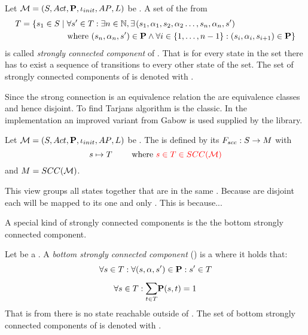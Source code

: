\documentclass[preview]{standalone}
\begin{document}
\begin{definition}
	Let ${{{\mathcal{M}}}} = {{({S}, {Act}, {\textbf{P}}, {\iota_{init}}, {AP}, {L})}}$ be \achgphN. A set of the from
	\begin{align*}
		{T} = \{{s}_1 \in {S} \mid & \; \forall {s}' \in {T} : \exists n \in {\mathbb{N}}, \exists \; \! ({s}_1, {\alpha}_1, {s}_2, {\alpha}_2 \dots, {s}_n, {\alpha}_n, {s}') \\
		&\text{ where } ({s}_n, {\alpha}_n, {s}') \in {\ensuremath{{\textbf{P}}}} \land \forall i \in \{1, \dots, n-1\} : ({s}_i, {\alpha}_i, {s}_{i+1}) \in {\ensuremath{{\textbf{P}}}} \}
	\end{align*}
	is called \emph{strongly connected component} of \chgph. That is for every state in the set there has to exist a sequence of transitions to every other state of the set. The set of strongly connected components of \chgph is denoted with \setscc.
\end{definition}

Since the strong connection is an equivalence relation the \sccsN are equivalence classes and hence disjoint. To find \sccsN Tarjans algorithm is the classic. In the implementation an improved variant from Gabow is used supplied by the \jgrapht library. 

\begin{definition}
	Let ${{{\mathcal{M}}}} = {{({S}, {Act}, {\textbf{P}}, {\iota_{init}}, {AP}, {L})}}$ be \achgphN. The \viewN \viewscc is defined by its \grpfctN ${{F_{scc}}} : {S} \to {\ensuremath{{M}}}$ with
	\[
	\state \mapsto \scc \quad \quad \text{ where } \redcomment{\state \in \scc \in \setscc}
	\]
	and ${{M}} = {SCC({{{\mathcal{M}}}})}$.
\end{definition}

This view groups all states together that are in the same \sccN. Because \sccsN are disjoint each \state will be mapped to its one and only \sccN. This is because... 

A special kind of strongly connected components is the the bottom strongly connected component.

\begin{definition}
	Let \scc be a \sccN. A \emph{bottom strongly connected component} (\bsccN) is a \sccN where it holds that: 
	\[
	\forall {s} \in {T} : \forall ({s}, {\alpha}, {s}') \in {\ensuremath{{\textbf{P}}}} : {s}' \in {T}
	\]
	\[
	\forall \state \in \scc : \bigsum{t \in \scc} \trans(\state, t) = 1
	\]
	That is from \scc there is no state reachable outside of \scc. The set of bottom strongly connected components of \chgph is denoted with \setbscc.
\end{definition}
\end{document}
